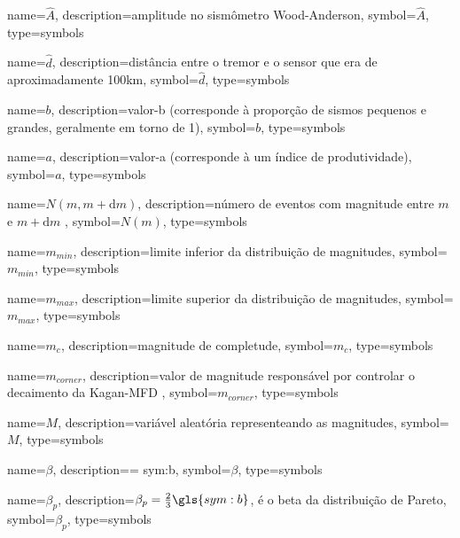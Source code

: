 {
	name={\ensuremath{\hat{A}}},
	description={amplitude no sismômetro Wood-Anderson},
	symbol={\ensuremath{\hat{A}}},
	type=symbols
}

{
	name={\ensuremath{\hat{d}}},
	description={distância entre o tremor e o sensor que era de aproximadamente 100km},
	symbol={\ensuremath{\hat{d}}},
	type=symbols
}


{
	name={\ensuremath{b}},
	description={valor-b (corresponde à proporção de sismos pequenos e grandes, geralmente em torno de 1)},
	symbol={\ensuremath{b}},
	type=symbols
}


{
	name={\ensuremath{a}},
	description={valor-a (corresponde à um índice de produtividade)},
	symbol={\ensuremath{a}},
	type=symbols
}


{
	name={\ensuremath{N(m,m+\mathrm{d}m)}},
	description={número de eventos com magnitude entre $m$ e $m + \mathrm{d}m$ },
	symbol={\ensuremath{N(m)}},
	type=symbols
}


{
	name={\ensuremath{m_{min}}},
	description={limite inferior da distribuição de magnitudes},
	symbol={\ensuremath{m_{min}}},
	type=symbols
}

{
	name={\ensuremath{m_{max}}},
	description={limite superior da distribuição de magnitudes},
	symbol={\ensuremath{m_{max}}},
	type=symbols
}

{
	name={\ensuremath{m_c}},
	description={magnitude de completude},
	symbol={\ensuremath{m_c}},
	type=symbols
}



{
	name={\ensuremath{m_{corner}}},
	description={valor de magnitude responsável por controlar o decaimento da Kagan-MFD },
	symbol={\ensuremath{m_{corner}}},
	type=symbols
}

{
	name={\ensuremath{M}},
	description={variável aleatória representeando as magnitudes},
	symbol={\ensuremath{M}},
	type=symbols
}

{
	name={\ensuremath{\beta}},
	description={\beta = \gls{sym:b}},
	symbol={\ensuremath{\beta}},
	type=symbols
}

{
	name={\ensuremath{\beta_p}},
	description={$\beta_p = \frac{2}{3}\gls{sym:b}$, é o beta da distribuição de Pareto},
	symbol={\ensuremath{\beta_p}},
	type=symbols
}

